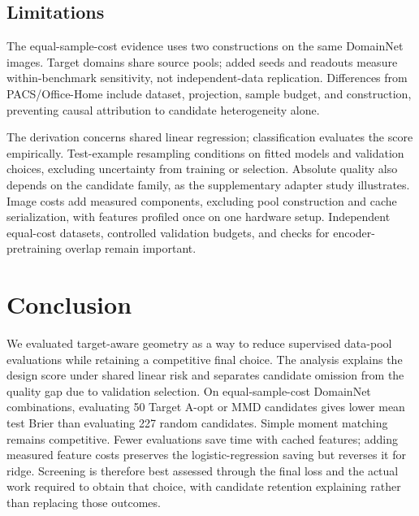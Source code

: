 \subsection{Limitations}
\label{sec:limitations}
The equal-sample-cost evidence uses two constructions on the same DomainNet images. Target domains share source pools; added seeds and readouts measure within-benchmark sensitivity, not independent-data replication. Differences from PACS/Office-Home include dataset, projection, sample budget, and construction, preventing causal attribution to candidate heterogeneity alone.

The derivation concerns shared linear regression; classification evaluates the score empirically. Test-example resampling conditions on fitted models and validation choices, excluding uncertainty from training or selection. Absolute quality also depends on the candidate family, as the supplementary adapter study illustrates. Image costs add measured components, excluding pool construction and cache serialization, with features profiled once on one hardware setup. Independent equal-cost datasets, controlled validation budgets, and checks for encoder-pretraining overlap remain important.

\section{Conclusion}
\label{sec:conclusion}
We evaluated target-aware geometry as a way to reduce supervised data-pool evaluations while retaining a competitive final choice. The analysis explains the design score under shared linear risk and separates candidate omission from the quality gap due to validation selection. On equal-sample-cost DomainNet combinations, evaluating 50 Target A-opt or MMD candidates gives lower mean test Brier than evaluating 227 random candidates. Simple moment matching remains competitive. Fewer evaluations save time with cached features; adding measured feature costs preserves the logistic-regression saving but reverses it for ridge. Screening is therefore best assessed through the final loss and the actual work required to obtain that choice, with candidate retention explaining rather than replacing those outcomes.
